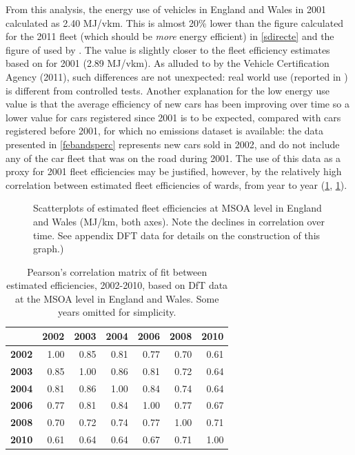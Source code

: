 From this analysis, the energy use of vehicles in England and
Wales in 2001 calculated as 2.40 MJ/vkm. This is almost 20\% lower than the figure
calculated for the 2011 fleet (which should be \emph{more} energy efficient)
in \cref{sdirecte} and the figure of used by \citet{MacKay2009}.
The value is slightly closer to the fleet efficiency estimates based on
\citet{Decc2011t} for 2001 (2.89 MJ/vkm).
As alluded to by the Vehicle
Certification Agency (2011), such differences are not unexpected: real world use
(reported in \citet{Decc2011t})
is different from controlled tests. Another explanation for the low energy use
value is that the average efficiency of new cars has been improving over time
so a lower value for cars registered since 2001 is to be expected, compared
with cars registered before 2001, for which no emissions dataset is available:
the data presented in \cref{febandsperc} represents new cars sold in 2002, and do not
include any of the car fleet that was on the road during 2001. The use of this
data as a proxy for 2001 fleet efficiencies may be justified, however, by the
relatively high correlation between estimated fleet efficiencies of wards, from
year to year (\cref{ffleetscat}, \cref{tfleetscat}).

\begin{figure}
 \caption[Scatterplots of estimated fleet efficiencies at MSOA level]
 {Scatterplots of estimated fleet efficiencies at MSOA level in England
and Wales (MJ/km, both axes). Note the declines in correlation over time.
See appendix DFT data for details on the construction of this graph.)
} \label{ffleetscat}
\end{figure}

\begin{table}[htbp]
\caption[Correlation matrix of estimated fleet efficiencies, 2002-2010]
{Pearson's correlation matrix of fit between estimated efficiencies,
2002-2010, based on DfT data at the MSOA level in England and Wales. Some years
omitted for simplicity.}
\begin{center}
\begin{tabular}{rrrrrrr}
\toprule
& \textbf{2002} & \textbf{2003} & \textbf{2004} &
\textbf{2006} & \textbf{2008} & \textbf{2010} \\
\midrule
\textbf{2002} & 1.00 & 0.85 & 0.81 & 0.77 & 0.70 & 0.61 \\
\textbf{2003} & 0.85 & 1.00 & 0.86 & 0.81 & 0.72 & 0.64 \\
\textbf{2004} & 0.81 & 0.86 & 1.00 & 0.84 & 0.74 & 0.64 \\
\textbf{2006} & 0.77 & 0.81 & 0.84 & 1.00 & 0.77 & 0.67 \\
\textbf{2008} & 0.70 & 0.72 & 0.74 & 0.77 & 1.00 & 0.71 \\
\textbf{2010} & 0.61 & 0.64 & 0.64 & 0.67 & 0.71 & 1.00 \\ \bottomrule
\end{tabular}  \end{center}
\label{tfleetscat}
\end{table}

